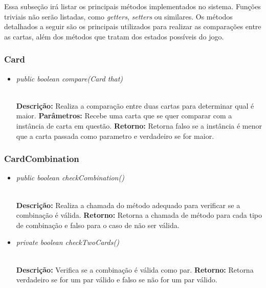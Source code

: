 \documentclass[12pt]{article}
\begin{document}
Essa subseção irá listar os principais métodos implementados no sistema. Funções triviais não serão listadas, como \textit{getters}, \textit{setters} ou similares. Os métodos detalhados a seguir são os principais utilizados para realizar as comparações entre as cartas, além dos métodos que tratam dos estados possíveis do jogo.

\subsubsection{Card}

\begin{itemize}
\item \begin{large}\textit{public boolean compare(Card that)}\end{large}\\
\subitem \textbf{Descrição:} Realiza a comparação entre duas cartas para determinar qual é maior.
\subitem \textbf{Parâmetros:} Recebe uma carta que se quer comparar com a instância de carta em questão.
\subitem \textbf{Retorno:} Retorna falso se a instância é menor que a carta passada como parametro e verdadeiro se for maior.
\end{itemize}

\vspace{0.2 true cm}

\subsubsection{CardCombination}

\begin{itemize}
\item \begin{large}\textit{public boolean checkCombination()}\end{large}\\
\subitem \textbf{Descrição:} Realiza a chamada do método adequado para verificar se a combinação é válida.
\subitem \textbf{Retorno:} Retorna a chamada de método para cada tipo de combinação e falso para o caso de não ser válida.
\end{itemize}

\vspace{0.2 true cm}

\begin{itemize}
\item \begin{large}\textit{private boolean checkTwoCards()}\end{large}\\
\subitem \textbf{Descrição:} Verifica se a combinação é válida como par.
\subitem \textbf{Retorno:} Retorna verdadeiro se for um par válido e falso se não for um par válido.
\end{itemize}
\end{document}
